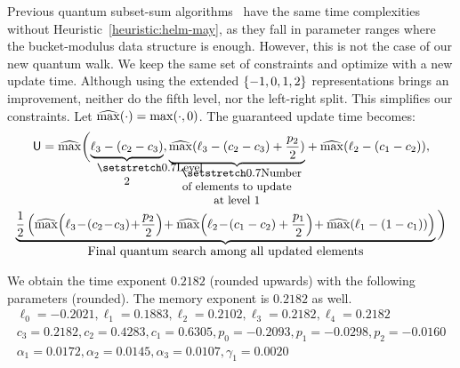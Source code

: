 Previous quantum subset-sum algorithms~\cite{DBLP:conf/pqcrypto/BernsteinJLM13,DBLP:conf/tqc/HelmM18} have the same time complexities without Heuristic~\ref{heuristic:helm-may}, as they fall in parameter ranges where the bucket-modulus data structure is enough. However, this is not the case of our new quantum walk. We keep the same set of constraints and optimize with a new update time. Although using the extended $\{-1,0,1,2\}$ representations brings an improvement, neither do the fifth level, nor the left-right split. This simplifies our constraints. Let $\widehat{ \mathrm{max}}(\cdot) = \max(\cdot,0)$. The guaranteed update time becomes:
\begin{multline*}
\mathsf{U} = \maxz \bigg( \undertext{Level 2}{\ell_3 - (c_2 - c_3)}, \undertext{Number of elements to update at level 1}{\maxz(\ell_3 - (c_2 - c_3) + \frac{p_2}{2})} + \maxz(\ell_2 - (c_1-c_2)) ,\\
\underbrace{ \frac{1}{2} \left( \maxz \!\left( \ell_3\! - \!(c_2 \!-\! c_3) \!+ \!\frac{p_2}{2}\right) \! + \maxz \!\left(\ell_2 \!- \!(c_1 - c_2) + \frac{p_1}{2}\right)\! + \maxz(\ell_1 - (1-c_1)) \right) }_{\mbox{Final quantum search among all updated elements}} \bigg)
\end{multline*}

We obtain the time exponent $0.2182$ (rounded upwards) with the following parameters (rounded). The memory exponent is $0.2182$ as well.
\begin{gather*}
\ell_0 = -0.2021, \ell_1 = 0.1883, \ell_2 = 0.2102, \ell_3 = 0.2182, \ell_4 = 0.2182  \\
c_3 = 0.2182, c_2 = 0.4283, c_1 = 0.6305, p_0 = -0.2093, p_1 = -0.0298, p_2 = -0.0160 \\
\alpha_1 = 0.0172, \alpha_2 = 0.0145, \alpha_3 = 0.0107, \gamma_1 = 0.0020
\end{gather*}

